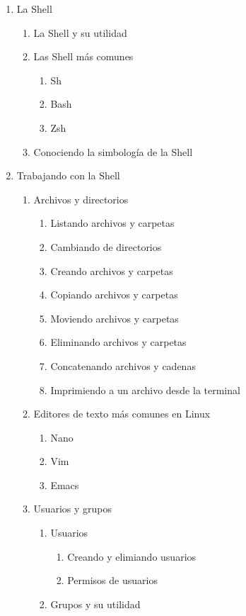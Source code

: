 \documentclass[12pt, letter-paper]{article}
\begin{document}
\begin{enumerate}
\item La Shell
  \begin{enumerate}
  \item La Shell y su utilidad
  \item Las Shell más comunes
    \begin{enumerate}
    \item Sh
    \item Bash
    \item Zsh
    \end{enumerate}
  \item Conociendo la simbología de la Shell
  \end{enumerate}
\item Trabajando con la Shell
  \begin{enumerate}
  \item Archivos y directorios
    \begin{enumerate}
    \item Listando archivos y carpetas
    \item Cambiando de directorios
    \item Creando archivos y carpetas
    \item Copiando archivos y carpetas
    \item Moviendo archivos y carpetas
    \item Eliminando archivos y carpetas
    \item Concatenando archivos y cadenas
    \item Imprimiendo a un archivo desde la terminal
    \end{enumerate}
  \item Editores de texto más comunes en Linux
    \begin{enumerate}
    \item Nano
    \item Vim
    \item Emacs
    \end{enumerate}
  \item Usuarios y grupos
    \begin{enumerate}
    \item Usuarios
      \begin{enumerate}
      \item Creando y elimiando usuarios
      \item Permisos de usuarios
      \end{enumerate}
    \item Grupos y su utilidad
      \begin{enumerate}

\end{enumerate}
\end{enumerate}
\end{enumerate}
\end{enumerate}
\end{document}
